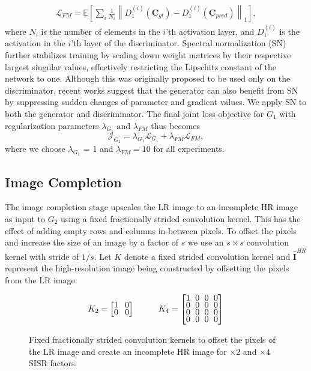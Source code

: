 \documentclass[10pt,twocolumn,letterpaper]{article}
\begin{document}
\begin{multline}
	\mathcal{L}_{FM} = \mathbb{E}\left[ \sum_{i} \frac{1}{N_i} \left\lVert D^{(i)}_1 (\mathbf{C}_{gt})- D^{(i)}_1 (\mathbf{C}_{pred}) \right\rVert_1 \right],
\end{multline}
where $N_i$ is the number of elements in the $i$'th activation layer, and $D_1^{(i)}$ is the activation in the $i$'th layer of the discriminator. Spectral normalization (SN) \cite{miyato2018spectral} further stabilizes training by scaling down weight matrices by their respective largest singular values, effectively restricting the Lipschitz constant of the network to one. Although this was originally proposed to be used only on the discriminator, recent works \cite{zhang2018self, odena2018generator} suggest that the generator can also benefit from SN by suppressing sudden changes of parameter and gradient values. We apply SN to both the generator and discriminator. The final joint loss objective for $G_1$ with regularization parameters $\lambda_{G_1}$ and $\lambda_{FM}$ thus becomes
\begin{equation}
	\mathcal{J}_{G_1} = \lambda_{G_1} \mathcal{L}_{G_1} + \lambda_{FM} \mathcal{L}_{FM} ,
	\label{eq:g1}
\end{equation}
where we choose $\lambda_{G_1}$ = 1 and $\lambda_{FM} = 10$ for all experiments. 

\subsection{Image Completion}
The image completion stage upscales the LR image to an incomplete HR image as input to $G_2$ using a fixed fractionally strided convolution kernel. This has the effect of adding empty rows and columns in-between pixels. To offset the pixels and increase the size of an image by a factor of $s$ we use an $s \times s$ convolution kernel with stride of $1/s$. Let $K$ denote a fixed strided convolution kernel and $\mathbf{\hat{I}}^{HR}$ represent the high-resolution image being constructed by offsetting the pixels from the LR image. 

\begin{figure}[h]
	\begin{equation*}
	\begin{split}
	K_2 =
	\setlength\arraycolsep{4pt}
	\begin{bmatrix}
	1 & 0 \\
	0 & 0
	\end{bmatrix}
	\hspace{10mm}
	K_4 =
	\setlength\arraycolsep{3pt}
	\renewcommand{\arraystretch}{0.6}
	\begin{bmatrix}
	1 & 0 & 0 & 0 \\
	0 & 0 & 0 & 0 \\
	0 & 0 & 0 & 0 \\
	0 & 0 & 0 & 0 
	\end{bmatrix}
	\end{split}
	\end{equation*}
	\caption{Fixed fractionally strided convolution kernels to offset the pixels of the LR image and create an incomplete HR image for $\times 2$ and $\times 4$ SISR factors.}
	\label{fig:sr_kernels}
\end{figure}
\end{document}

